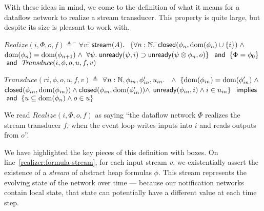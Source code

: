 \documentclass[preprint,natbib]{sigplanconf}
\begin{document}
With these ideas in mind, we come to the definition of what it means
for a dataflow network to realize a stream transducer. This property
is quite large, but despite its size is pleasant to work with.
{\small
\begin{specification}
\nextline
$Realize(i, \Phi, o, f) \triangleq$ 
\;\= $\forall v:$\=$\,\mbox{\textsf{{stream}}}({A}).\;$  
\>\> $\{\forall n:\mathbb{N}.\;$\=$\mbox{\textsf{{closed}}}({\phi_n}, {\mbox{dom}({\phi_n}) \cup \{{i}\}}) \;\land$ \nextline
\>\>\>$\mbox{dom}({\phi_n}) = \mbox{dom}({\phi_{n+1}})\; \land$ 
\>\>\>$\forall \psi.\; \mbox{\textsf{{unready}}}({\psi}, {i}) \supset \mbox{\textsf{{unready}}}({\psi \otimes \phi_n}, {o})\}$ 
\>\> $\;\mbox{\textsf{{and}}}\; \; \{\Phi = \phi_0\}$ 
\>\> $\;\mbox{\textsf{{and}}}\; \;  \mathit{Transduce}(i, \phi, o, u, f, v)$ 


$\mathit{Transduce}(ri, \phi, o, u, f, v) \triangleq$ 
\> $\forall $\=$ n:\mathbb{N}, \phi_{in}, \phi'_{in}, u_{in}.$ \nextline
\>\>  $\; \land$ \nextline
\>\> $\{$\=$\mbox{dom}({\phi_{in}}) = \mbox{dom}({\phi'_{in}}) \;\land $ \nextline
\>\>     \>$\mbox{\textsf{{closed}}}({\phi_{in}}, {\mbox{dom}({\phi_{in}})}) \land 
            \mbox{\textsf{{closed}}}({\phi_{in}}, {\mbox{dom}({\phi'_{in}})}) \land $ \nextline
\>\>     \>$\mbox{\textsf{{unready}}}({\phi_{in}}, {i}) \land
            i \in u_{in}\}$ \nextline
\>\> \!\!\!\!$\mbox{\textsf{{ implies }}}$ \nextline
\>\>  \nextline
\>\> $\;\mbox{\textsf{{and}}}\;\; \{u \subseteq \mbox{dom}({\phi_n}) \land o \in u\}$ \nextline
\end{specification}
}

We read $Realize(i, \Phi, o, f)$ as saying ``the dataflow network
$\Phi$ realizes the stream transducer $f$, when the event loop writes
inputs into $i$ and reads outputs from $o$''. 

We have highlighted the key pieces of this definition with boxes. On
line~\ref{realizer:formula-stream}, for each input stream $v$, we
existentially assert the existence of a \emph{stream} of abstract heap
formulas $\phi$. This stream represents the evolving state of the
network over time --- because our notification networks contain local
state, that state can potentially have a different value at each time
step.
\end{document}
